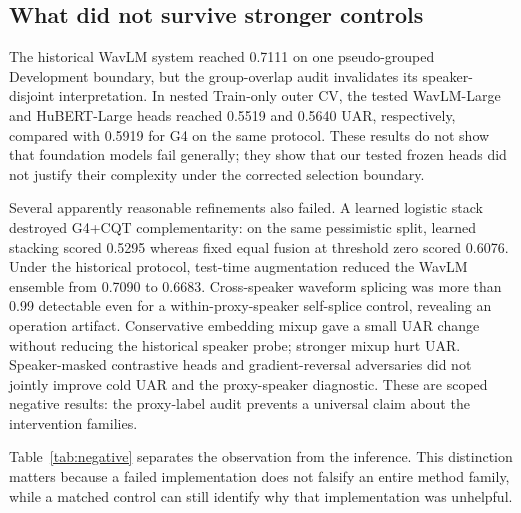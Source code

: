 \subsection{What did not survive stronger controls}

The historical WavLM system reached 0.7111 on one pseudo-grouped Development
boundary, but the group-overlap audit invalidates its speaker-disjoint
interpretation. In nested Train-only outer CV, the tested WavLM-Large and
HuBERT-Large heads reached 0.5519 and 0.5640 UAR, respectively, compared with
0.5919 for G4 on the same protocol. These results do not show that foundation
models fail generally; they show that our tested frozen heads did not justify
their complexity under the corrected selection boundary.

Several apparently reasonable refinements also failed. A learned logistic
stack destroyed G4+CQT complementarity: on the same pessimistic split, learned
stacking scored 0.5295 whereas fixed equal fusion at threshold zero scored
0.6076. Under the historical protocol, test-time augmentation reduced the
WavLM ensemble from 0.7090 to 0.6683. Cross-speaker waveform splicing was more
than 0.99 detectable even for a within-proxy-speaker self-splice control,
revealing an operation artifact. Conservative embedding mixup gave a small
UAR change without reducing the historical speaker probe; stronger mixup hurt
UAR. Speaker-masked contrastive heads and gradient-reversal adversaries did
not jointly improve cold UAR and the proxy-speaker diagnostic. These are
scoped negative results: the proxy-label audit prevents a universal claim
about the intervention families.

Table~\ref{tab:negative} separates the observation from the inference. This
distinction matters because a failed implementation does not falsify an entire
method family, while a matched control can still identify why that
implementation was unhelpful.

